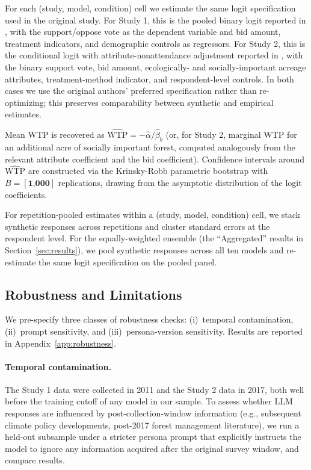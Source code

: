 \documentclass[12pt]{article}
\begin{document}
For each (study, model, condition) cell we estimate the same logit
specification used in the original study. For Study 1, this is the pooled
binary logit reported in \textcite{Aldy2012}, with the support/oppose vote
as the dependent variable and bid amount, treatment indicators, and
demographic controls as regressors. For Study 2, this is the conditional
logit with attribute-nonattendance adjustment reported in
\textcite{Giguere2020}, with the binary support vote, bid amount,
ecologically- and socially-important acreage attributes, treatment-method
indicator, and respondent-level controls. In both cases we use the
original authors' preferred specification rather than re-optimizing; this
preserves comparability between synthetic and empirical estimates.

Mean WTP is recovered as $\widehat{\text{WTP}} = -\hat{\alpha}/\hat{\beta}_b$
(or, for Study 2, marginal WTP for an additional acre of socially important
forest, computed analogously from the relevant attribute coefficient and
the bid coefficient). Confidence intervals around $\widehat{\text{WTP}}$
are constructed via the Krinsky-Robb parametric bootstrap with
$B = [\textbf{1{,}000}]$ replications, drawing from the asymptotic
distribution of the logit coefficients.

For repetition-pooled estimates within a (study, model, condition) cell,
we stack synthetic responses across repetitions and cluster standard
errors at the respondent level. For the equally-weighted ensemble (the
``Aggregated'' results in Section~\ref{sec:results}), we pool synthetic
responses across all ten models and re-estimate the same logit
specification on the pooled panel.

\subsection{Robustness and Limitations}\label{sec:methods-robustness}

We pre-specify three classes of robustness checks: (i)~temporal
contamination, (ii)~prompt sensitivity, and (iii)~persona-version
sensitivity. Results are reported in Appendix~\ref{app:robustness}.

\paragraph{Temporal contamination.} The Study 1 data were collected in
2011 and the Study 2 data in 2017, both well before the training cutoff
of any model in our sample. To assess whether LLM responses are
influenced by post-collection-window information (e.g., subsequent
climate policy developments, post-2017 forest management literature), we
run a held-out subsample under a stricter persona prompt that explicitly
instructs the model to ignore any information acquired after the original
survey window, and compare results.
\end{document}
